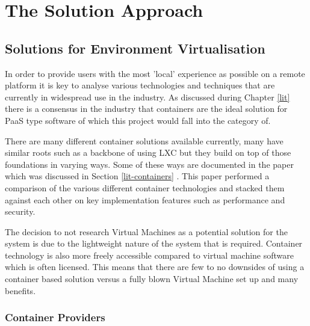 \chapter{The Solution Approach} \label{solapp}

\section{Solutions for Environment Virtualisation} \label{subapp-virt}
In order to provide users with the most 'local' experience as possible on a remote platform it is key to analyse various technologies and techniques that are currently in widespread use in the industry. As discussed during Chapter \ref{lit} there is a consensus in the industry that containers are the ideal solution for PaaS type software of which this project would fall into the category of.

There are many different container solutions available currently, many have similar roots such as a backbone of using LXC but they build on top of those foundations in varying ways. Some of these ways are documented in the paper which was discussed in Section \ref{lit-containers} \cite{contsvsvirt}. This paper performed a comparison of the various different container technologies and stacked them against each other on key implementation features such as performance and security.

The decision to not research Virtual Machines as a potential solution for the system is due to the lightweight nature of the system that is required. Container technology is also more freely accessible compared to virtual machine software which is often licensed. This means that there are few to no downsides of using a container based solution versus a fully blown Virtual Machine set up and many benefits.

\subsection{Container Providers} 

